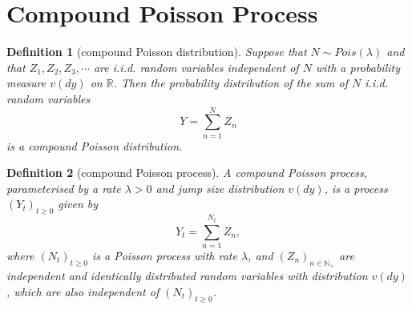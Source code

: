 \documentclass{article}
\newtheorem{definition}{Definition}[section]
\theoremstyle{nonumberplain}
\begin{document}
\section{Compound Poisson Process}
\begin{definition}[compound Poisson distribution]
	Suppose that
	$N\sim Pois(\lambda )$ and that $Z_{1},Z_{2},Z_{3},\cdots $ are i.i.d. random variables independent of $N$ with a probability measure $v(dy)$ on $\mathbb{R}$. Then the probability distribution of the sum of $N$ i.i.d. random variables
	\[
	Y=\sum _{n=1}^{N}Z_{n}
	\]
	is a \emph{compound Poisson distribution}.
\end{definition}


\begin{definition}[compound Poisson process]
	\emph{A compound Poisson process}, parameterised by a rate $\lambda >0$ and jump size distribution $v(dy)$, is a process $(Y_t)_{t\ge 0}$ given by
	\[
	Y_t=\sum _{n=1}^{N_t}Z_{n},
	\]
	where $(N_t)_{t\ge 0}$ is a Poisson process with rate $\lambda$, and $(Z_n)_{n\in \mathbb{N}_+}$ are independent and identically distributed random variables with distribution $v(dy)$, which are also independent of $(N_t)_{t\ge 0}$.
\end{definition}
\end{document}
